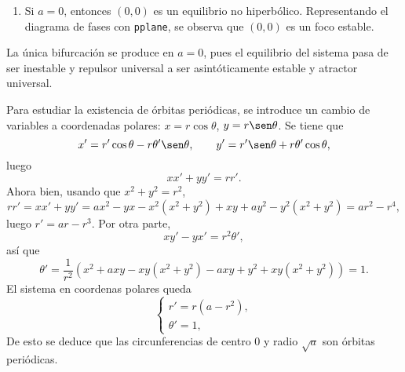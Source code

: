\documentclass[11pt]{report}
\begin{document}
\begin{solution}
\begin{enumerate}
        \item Si $a = 0$, entonces $(0,0)$ es un equilibrio no hiperbólico. Representando el diagrama de fases con \texttt{pplane}, se observa que $(0,0)$ es un foco estable.
    \end{enumerate}
    La única bifurcación se produce en $a = 0$, pues el equilibrio del sistema pasa de ser inestable y repulsor universal a ser asintóticamente estable y atractor universal.

    Para estudiar la existencia de órbitas periódicas, se introduce un cambio de variables a coordenadas polares: $ x = r\cos\theta$, $y = r\sen\theta$. Se tiene que
    \[x' =r'\cos\theta -r\theta'\sen\theta, \qquad y' = r'\sen\theta+r\theta'\cos\theta, \]
    luego
    \[xx'+yy' = rr'.\]
    Ahora bien, usando que $x^2+y^2= r^2$,
    \[rr' = xx' + yy' = ax^2-yx-x^2(x^2+y^2)+xy+ay^2-y^2(x^2+y^2) = ar^2-r^4,\]
    luego $r' = ar-r^3$. Por otra parte,
    \[xy'-yx' = r^2\theta',\]
    así que
    \[\theta' = \frac{1}{r^2}(x^2+axy-xy(x^2+y^2)-axy+y^2+xy(x^2+y^2)) = 1.\]
    El sistema en coordenas polares queda
    \[\begin{cases}
        r' = r(a-r^2), \\
        \theta' = 1,
    \end{cases}\]
    De esto se deduce que las circunferencias de centro $0$ y radio $\sqrt{a}$ son órbitas periódicas.
\end{solution}

\addtocounter{exercise}{-5}
\end{document}
